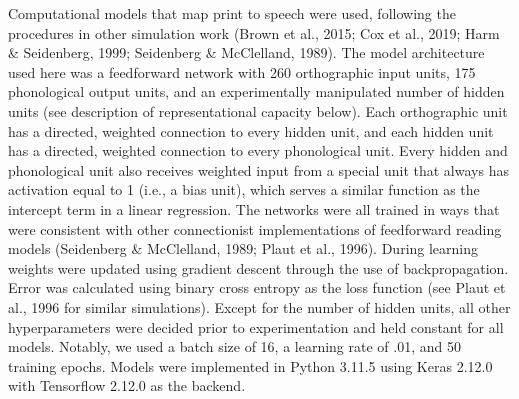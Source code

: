 \documentclass[
  ,man,floatsintext]{apa6}
\begin{document}
Computational models that map print to speech were used, following the procedures in other simulation work (Brown et al., 2015; Cox et al., 2019; Harm \& Seidenberg, 1999; Seidenberg \& McClelland, 1989). The model architecture used here was a feedforward network with 260 orthographic input units, 175 phonological output units, and an experimentally manipulated number of hidden units (see description of representational capacity below). Each orthographic unit has a directed, weighted connection to every hidden unit, and each hidden unit has a directed, weighted connection to every phonological unit. Every hidden and phonological unit also receives weighted input from a special unit that always has activation equal to 1 (i.e., a bias unit), which serves a similar function as the intercept term in a linear regression. The networks were all trained in ways that were consistent with other connectionist implementations of feedforward reading models (Seidenberg \& McClelland, 1989; Plaut et al., 1996). During learning weights were updated using gradient descent through the use of backpropagation. Error was calculated using binary cross entropy as the loss function (see Plaut et al., 1996 for similar simulations). Except for the number of hidden units, all other hyperparameters were decided prior to experimentation and held constant for all models. Notably, we used a batch size of 16, a learning rate of .01, and 50 training epochs. Models were implemented in Python 3.11.5 using Keras 2.12.0 with Tensorflow 2.12.0 as the backend.
\end{document}
